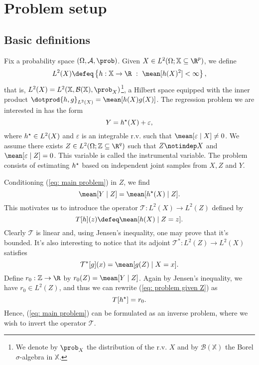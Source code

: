 \section{Problem setup}

\subsection{Basic definitions}

Fix a probability space $ ( \Omega, \mathcal{A}, \prob ) $.
Given $ X \in L^{ 2 } ( \Omega ; \mathbb{X} \subseteq \R^{ p } ) $, we define
\begin{equation*}
    L^{ 2 } ( X ) \defeq \left\{ h : \mathbb{X} \to \R \ : \ \mean [ h ( X )^2 ] < \infty \right\}
,\end{equation*}
that is, $ L^{ 2 } ( X ) = L^{ 2 } ( \mathbb{X}, \mathcal{B} ( \mathbb{X} ), \prob_{ X } ) $\footnote{We denote by $ \prob_{ X } $ the distribution of the r.v. $ X $ and by $ \mathcal{B} ( \mathbb{X} ) $ the Borel $ \sigma $-algebra in $ \mathbb{X} $.}, a Hilbert space equipped with the inner product $ \dotprod{ h, g }_{ L^{ 2 } ( X ) } = \mean [ h ( X ) g ( X ) ] $.
The regression problem we are interested in has the form
\begin{equation}
    \label{eq: main problem}
    Y = h^{ \star } (X) + \varepsilon
,\end{equation}
where $ h^{ \star } \in L^{ 2 } ( X ) $ and $ \varepsilon $ is an integrable r.v. such that $ \mean [ \varepsilon \mid X ] \neq 0 $.
We assume there exists $ Z \in L^{ 2 } ( \Omega ; \mathbb{Z} \subseteq \R^{ q } ) $ such that $ Z \notindep X $ and $ \mean [ \varepsilon \mid Z ] = 0 $.
This variable is called the instrumental variable.
The problem consists of estimating $ h^{ \star } $ based on independent joint samples from $ X, Z $ and $ Y $.

Conditioning (\ref{eq: main problem}) in $ Z $, we find
\begin{equation}
    \label{eq: problem given Z}
    \mean [ Y \mid Z ] = \mean [ \hstar ( X ) \mid Z ]
.\end{equation}
This motivates us to introduce the operator $ \mathcal{T} : L^{ 2 } ( X ) \to L^{ 2 } ( Z ) $ defined by
\begin{equation*}
    T [ h ] ( z ) \defeq \mean [ h ( X ) \mid Z = z ]
.\end{equation*}
Clearly $ \mathcal{T} $ is linear and, using Jensen's inequality, one may prove that it's bounded.
It's also interesting to notice that its adjoint $ \mathcal{T}^{ * } : L^{ 2 } ( Z ) \to L^{ 2 } ( X ) $ satisfies
\begin{equation}
    \label{eq: T adjoint}
    \mathcal{T}^{ * } [ g ] ( x ) = \mean [ g ( Z ) \mid X = x ].
\end{equation}
Define $ r_{ 0 } : \mathbb{Z} \to \R $ by $ r_{ 0 } ( Z ) = \mean [ Y \mid Z ] $.
Again by Jensen's inequality, we have $ r_{ 0 } \in L^{ 2 } ( Z ) $, and thus we can rewrite (\ref{eq: problem given Z}) as
\begin{equation}
    \label{eq: problem with T}
    T [ h^{ \star } ] = r_{ 0 }
.\end{equation}
Hence, (\ref{eq: main problem}) can be formulated as an inverse problem, where we wish to invert the operator $ \mathcal{T} $.

